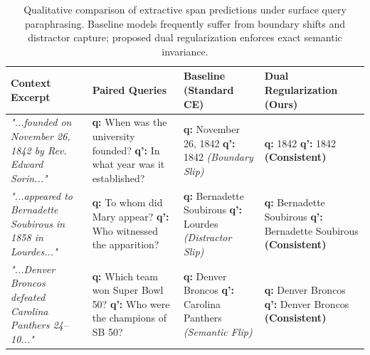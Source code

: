 \begin{table}[t]
\centering
\small
\begin{tabular}{p{4.2cm}p{4.4cm}p{3.2cm}p{3.2cm}}
\toprule
\textbf{Context Excerpt} & \textbf{Paired Queries} & \textbf{Baseline (Standard CE)} & \textbf{Dual Regularization (Ours)} \\
\midrule
\textit{"...founded on November 26, 1842 by Rev. Edward Sorin..."} & 
\textbf{q:} When was the university founded?\newline
\textbf{q':} In what year was it established? & 
\textbf{q:} November 26, 1842\newline
\textbf{q':} 1842 \textit{(Boundary Slip)} & 
\textbf{q:} 1842\newline
\textbf{q':} 1842 \textbf{(Consistent)} \\
\midrule
\textit{"...appeared to Bernadette Soubirous in 1858 in Lourdes..."} & 
\textbf{q:} To whom did Mary appear?\newline
\textbf{q':} Who witnessed the apparition? & 
\textbf{q:} Bernadette Soubirous\newline
\textbf{q':} Lourdes \textit{(Distractor Slip)} & 
\textbf{q:} Bernadette Soubirous\newline
\textbf{q':} Bernadette Soubirous \textbf{(Consistent)} \\
\midrule
\textit{"...Denver Broncos defeated Carolina Panthers 24--10..."} & 
\textbf{q:} Which team won Super Bowl 50?\newline
\textbf{q':} Who were the champions of SB 50? & 
\textbf{q:} Denver Broncos\newline
\textbf{q':} Carolina Panthers \textit{(Semantic Flip)} & 
\textbf{q:} Denver Broncos\newline
\textbf{q':} Denver Broncos \textbf{(Consistent)} \\
\bottomrule
\end{tabular}
\caption{Qualitative comparison of extractive span predictions under surface query paraphrasing. Baseline models frequently suffer from boundary shifts and distractor capture; proposed dual regularization enforces exact semantic invariance.}
\label{tab:qualitative_cases}
\end{table}
